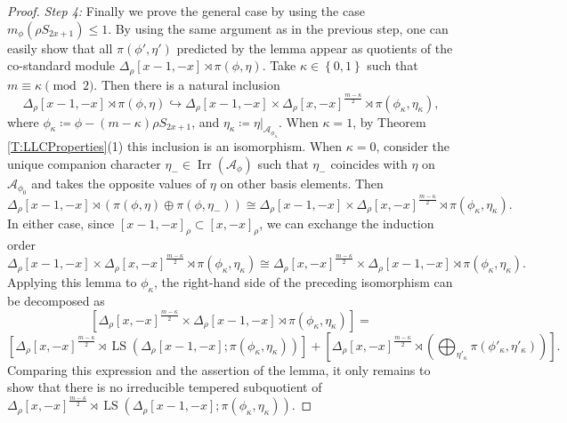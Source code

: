 \documentclass[11pt,letterpaper]{amsart}
\theoremstyle{plain}
\numberwithin{theorem}{section}
\numberwithin{equation}{subsection}
\theoremstyle{remark}
\newcommand{\Irr}{\operatorname{Irr}}
\newcommand{\LS}{\operatorname{LS}} %
\def\calA{\mathcal{A}}
\begin{document}
\begin{proof}
\emph{Step 4:} Finally we prove the general case by using the case $m_\phi\left(\rho S_{2x+1}\right)\leq 1$. By using the same argument as in the previous step, one can easily show that all $\pi\left(\phi',\eta'\right)$ predicted by the lemma appear as quotients of the co-standard module $\Delta_\rho\left[x-1,-x\right]\rtimes\pi\left(\phi,\eta\right)$. %
Take $\kappa\in\left\{0,1\right\}$ such that $m\equiv \kappa\pmod2$. Then there is a natural inclusion
\[
    \Delta_\rho\left[x-1,-x\right]\rtimes\pi\left(\phi,\eta\right) \hookrightarrow \Delta_\rho\left[x-1,-x\right] \times \Delta_\rho[x,-x]^{\frac{m-\kappa}{2}}\rtimes\pi\left(\phi_\kappa,\eta_\kappa\right),
\]
where $\phi_\kappa \coloneqq \phi - (m-\kappa)\rho S_{2x+1}$, and $\eta_\kappa \coloneqq \eta\big|_{\calA_{\phi_\kappa}}$. When $\kappa=1$, by Theorem \ref{T:LLCProperties}(1) this inclusion is an isomorphism. When $\kappa=0$, consider the unique companion character $\eta_-\in\Irr\left(\calA_\phi\right)$ such that $\eta_-$ coincides with $\eta$ on $\calA_{\phi_0}$ and takes the opposite values of $\eta$ on other basis elements. Then
\[
    \Delta_\rho\left[x-1,-x\right]\rtimes\left(\pi\left(\phi,\eta\right)\oplus \pi\left(\phi,\eta_-\right)\right) \cong \Delta_\rho\left[x-1,-x\right] \times \Delta_\rho[x,-x]^{\frac{m-\kappa}{2}}\rtimes\pi\left(\phi_\kappa,\eta_\kappa\right).
\]
In either case, since $[x-1,-x]_\rho\subset[x,-x]_\rho$, we can exchange the induction order
\[
    \Delta_\rho\left[x-1,-x\right] \times \Delta_\rho[x,-x]^{\frac{m-\kappa}{2}}\rtimes\pi\left(\phi_\kappa,\eta_\kappa\right)\cong\Delta_\rho[x,-x]^{\frac{m-\kappa}{2}}\times \Delta_\rho\left[x-1,-x\right]\rtimes\pi\left(\phi_\kappa,\eta_\kappa\right).
\]
Applying this lemma to $\phi_\kappa$, the right-hand side of the preceding isomorphism can be decomposed as
\[
    \left[\Delta_\rho[x,-x]^{\frac{m-\kappa}{2}}\times \Delta_\rho\left[x-1,-x\right]\rtimes\pi\left(\phi_\kappa,\eta_\kappa\right)\right] = 
\]
\[
    \left[\Delta_\rho[x,-x]^{\frac{m-\kappa}{2}}\rtimes \LS\left(\Delta_\rho\left[x-1,-x\right];\pi\left(\phi_\kappa,\eta_\kappa\right)\right)\right] + \left[\Delta_\rho[x,-x]^{\frac{m-\kappa}{2}}\rtimes \left(\bigoplus_{\eta'_\kappa}\pi\left(\phi'_\kappa,\eta'_\kappa\right)\right)\right].
\]
Comparing this expression and the assertion of the lemma, it only remains to show that there is no irreducible tempered subquotient of $\Delta_\rho[x,-x]^{\frac{m-\kappa}{2}}\rtimes \LS\left(\Delta_\rho\left[x-1,-x\right];\pi\left(\phi_\kappa,\eta_\kappa\right)\right)$.


\end{proof}
\end{document}
